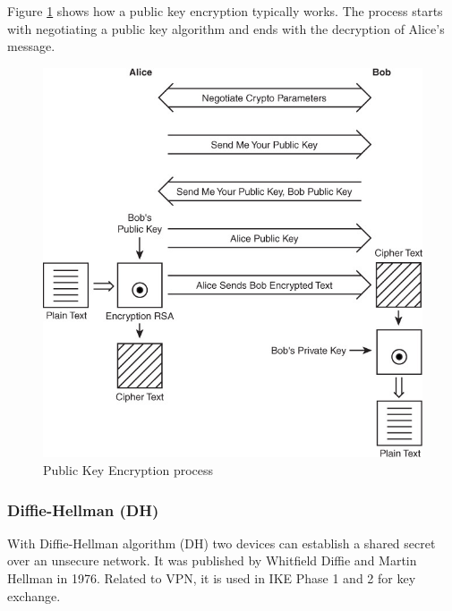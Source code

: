 \documentclass[a4paper]{report}
\begin{document}
Figure \ref{fig:asym_alg} shows how a public key encryption typically works. The process starts with negotiating a public key algorithm and ends with the decryption of Alice's message.
\begin{figure}[htb]
	\includegraphics[width=\linewidth]{asym_alg.jpg}
	\caption{Public Key Encryption process}
	\label{fig:asym_alg}
\end{figure}

\subsubsection{Diffie-Hellman (DH)}
\label{sssec:diffie-hellman}
With Diffie-Hellman algorithm (DH) two devices can establish a shared secret over an unsecure network. It was published by Whitfield Diffie and Martin Hellman in 1976. Related to VPN, it is used in IKE Phase 1 and 2 for key exchange. 
\end{document}
